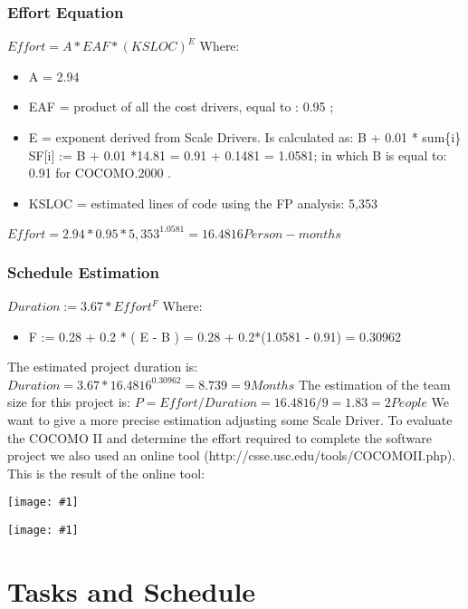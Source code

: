 \documentclass[11pt, a4paper,titlepage]{article}
\newcommand{\image}[1]{
	\begin{center}
		\noindent \texttt{[image: \#1]}
	\end{center}
}
\begin{document}
		\subsubsection{Effort Equation}
		$ Effort = A * EAF * (KSLOC)^{E} $
	    \newline
		Where:
		\begin{itemize}
			\item 	A = 2.94
			\item EAF = product of all the cost drivers, equal to : 0.95 ;
			\item E = exponent derived from Scale Drivers. Is calculated as: \newline
				B + 0.01 * sum\{i\} SF[i] := B + 0.01 *14.81 = 0.91 + 0.1481 = 1.0581;
				in which B is equal to: 0.91 for COCOMO.2000 .
			\item KSLOC = estimated lines of code using the FP analysis: 5,353
		\end{itemize}
	   $ Effort = 2.94* 0.95* 5,353^{1.0581}  = 16.4816 Person-months $
		
	   \subsubsection{Schedule Estimation}
	   $Duration := 3.67 * Effort^{F}$
	   \newline    
	   Where:
	   	\begin{itemize}
	   		\item F := 0.28 + 0.2 * ( E - B ) = 0.28 + 0.2*(1.0581 - 0.91) = 0.30962
	   	\end{itemize}
	   The estimated project duration is: \newline
	   $ Duration = 3.67 * 16.4816^{0.30962} = 8.739 = 9 Months$
	   \newline
	   The estimation of the team size for this project is:
	   \newline
	   $P = Effort / Duration = 16.4816/ 9 = 1.83 = 2 People $
	   \newline
	   \newline
	   We want to give a more precise estimation adjusting some Scale Driver.
	   To evaluate the COCOMO II and determine the effort required to complete the software project we also used an online tool (http://csse.usc.edu/tools/COCOMOII.php).\newline
	   This is the result of the online tool: 
	   \image{cocomo1.png}
	   \image{cocomo2.png}
		
	\section{Tasks and Schedule}
	
\end{document}
